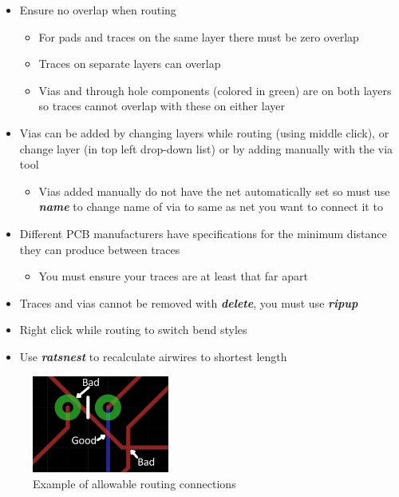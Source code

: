 \documentclass{article}
\begin{document}
\begin{itemize}
    \item Ensure no overlap when routing
    \begin{itemize}
        \item For pads and traces on the same layer there must be zero overlap
        \item Traces on separate layers can overlap
        \item Vias and through hole components (colored in green) are on both layers so traces cannot overlap with these on either layer
    \end{itemize}
    \item Vias can be added by changing layers while routing (using middle click), or change layer (in top left drop-down list) or by adding manually with the via tool
    \begin{itemize}
        \item Vias added manually do not have the net automatically set so must use \textit{\textbf{name}} to change name of via to same as net you want to connect it to
    \end{itemize}
    \item Different PCB manufacturers have specifications for the minimum distance they can produce between traces
    \begin{itemize}
        \item You must ensure your traces are at least that far apart
    \end{itemize}
    \item Traces and vias cannot be removed with \textit{\textbf{delete}}, you must use \textit{\textbf{ripup}}
\end{itemize}
\begin{tcolorbox} [title=Tips \& Tricks]
    \begin{itemize}
        \item Right click while routing to switch bend styles
        \item Use \textit{\textbf{ratsnest}} to recalculate airwires to shortest
        length
    \end{itemize}
\end{tcolorbox}

\begin{figure}[!h]
    \center
    \includegraphics[width=0.4\textwidth,height=0.4\textheight,keepaspectratio]{routing}
    \caption {Example of allowable routing connections}
    \label{img:routing}
\end{figure}
\end{document}
